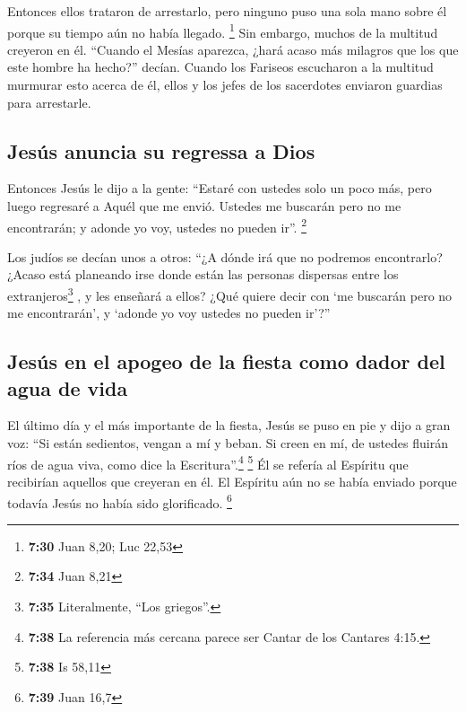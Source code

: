  Entonces ellos trataron de arrestarlo, pero ninguno puso
una sola mano sobre él porque su tiempo aún no había llegado.
\footnote{\textbf{7:30} Juan 8,20; Luc 22,53}  Sin
embargo, muchos de la multitud creyeron en él. ``Cuando el Mesías
aparezca, ¿hará acaso más milagros que los que este hombre ha hecho?''
decían.  Cuando los Fariseos escucharon a la multitud
murmurar esto acerca de él, ellos y los jefes de los sacerdotes enviaron
guardias para arrestarle.

\hypertarget{jesuxfas-anuncia-su-regressa-a-dios}{%
\subsection{Jesús anuncia su regressa a
Dios}\label{jesuxfas-anuncia-su-regressa-a-dios}}

 Entonces Jesús le dijo a la gente: ``Estaré con ustedes
solo un poco más, pero luego regresaré a Aquél que me envió.
 Ustedes me buscarán pero no me encontrarán; y adonde yo
voy, ustedes no pueden ir''. \footnote{\textbf{7:34} Juan 8,21}

 Los judíos se decían unos a otros: ``¿A dónde irá que no
podremos encontrarlo? ¿Acaso está planeando irse donde están las
personas dispersas entre los extranjeros\footnote{\textbf{7:35}
  Literalmente, ``Los griegos''.} , y les enseñará a ellos?
 ¿Qué quiere decir con `me buscarán pero no me
encontrarán', y `adonde yo voy ustedes no pueden ir'?''

\hypertarget{jesuxfas-en-el-apogeo-de-la-fiesta-como-dador-del-agua-de-vida}{%
\subsection{Jesús en el apogeo de la fiesta como dador del agua de
vida}\label{jesuxfas-en-el-apogeo-de-la-fiesta-como-dador-del-agua-de-vida}}

 El último día y el más importante de la fiesta, Jesús se
puso en pie y dijo a gran voz: ``Si están sedientos, vengan a mí y
beban.  Si creen en mí, de ustedes fluirán ríos de agua
viva, como dice la Escritura''.\footnote{\textbf{7:38} La referencia más
  cercana parece ser Cantar de los Cantares 4:15.} \footnote{\textbf{7:38}
  Is 58,11}  Él se refería al Espíritu que recibirían
aquellos que creyeran en él. El Espíritu aún no se había enviado porque
todavía Jesús no había sido glorificado. \footnote{\textbf{7:39} Juan
  16,7}


